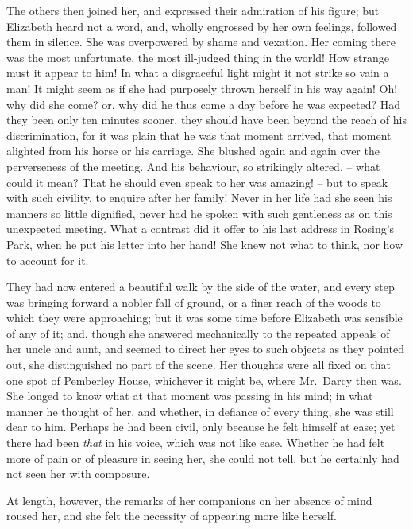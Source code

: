 The others then joined her, and expressed their admiration
of his figure; but Elizabeth heard not a word, and,
wholly engrossed by her own feelings, followed them in
silence. She was overpowered by shame and vexation.
Her coming there was the most unfortunate, the most
ill-judged thing in the world! How strange must it
appear to him! In what a disgraceful light might it not
strike so vain a man! It might seem as if she had purposely
thrown herself in his way again! Oh! why did she
come? or, why did he thus come a day before he was
expected? Had they been only ten minutes sooner, they
should have been beyond the reach of his discrimination,
for it was plain that he was that moment arrived, that
moment alighted from his horse or his carriage. She
blushed again and again over the perverseness of the
meeting. And his behaviour, so strikingly altered, -- what
could it mean? That he should even speak to her
was amazing! -- but to speak with such civility, to enquire
after her family! Never in her life had she seen his
manners so little dignified, never had he spoken with such
gentleness as on this unexpected meeting. What a contrast
did it offer to his last address in Rosing’s Park, when he
put his letter into her hand! She knew not what to think,
nor how to account for it.

They had now entered a beautiful walk by the side of
the water, and every step was bringing forward a nobler
fall of ground, or a finer reach of the woods to which they
were approaching; but it was some time before Elizabeth
was sensible of any of it; and, though she answered
mechanically to the repeated appeals of her uncle and
aunt, and seemed to direct her eyes to such objects as
they pointed out, she distinguished no part of the scene.
Her thoughts were all fixed on that one spot of Pemberley
House, whichever it might be, where Mr.\ Darcy then was.
She longed to know what at that moment was passing
in his mind; in what manner he thought of her, and
whether, in defiance of every thing, she was still dear to
him. Perhaps he had been civil, only because he felt
himself at ease; yet there had been \textit{that} in his voice,
which was not like ease. Whether he had felt more of
pain or of pleasure in seeing her, she could not tell, but he
certainly had not seen her with composure.

At length, however, the remarks of her companions on
her absence of mind roused her, and she felt the necessity
of appearing more like herself.


